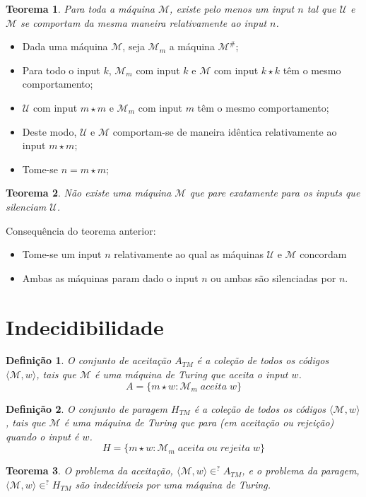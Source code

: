 \documentclass[10pt,a4paper]{report}
\newtheorem{definition}{Definição}
\newtheorem{theorem}{Teorema}
\begin{document}
\begin{theorem}
Para toda a máquina $\mathcal{M}$, existe pelo menos um input $n$ tal que $\mathcal{U}$ e $\mathcal{M}$ se comportam da mesma maneira relativamente ao input $n$.
\end{theorem}
\begin{itemize}
\item Dada uma máquina $\mathcal{M}$, seja $\mathcal{M}_m$ a máquina $\mathcal{M}^\#$;
\item Para todo o input $k$, $\mathcal{M}_m$ com input $k$ e $\mathcal{M}$ com input $k\star k$ têm o mesmo comportamento;
\item $\mathcal{U}$ com input $m\star m$ e $\mathcal{M}_m$ com input $m$ têm o mesmo comportamento;
\item Deste modo, $\mathcal{U}$ e $\mathcal{M}$ comportam-se de maneira idêntica relativamente
ao input $m\star m$;
\item Tome-se $n = m\star m$;
\end{itemize}
\begin{theorem}
Não existe uma máquina $\mathcal{M}$ que pare exatamente para os inputs que silenciam $\mathcal{U}$.
\end{theorem}
Consequência do teorema anterior:
\begin{itemize}
\item Tome-se um input $n$ relativamente ao qual as máquinas $\mathcal{U}$ e $\mathcal{M}$ concordam
\item Ambas as máquinas param dado o input $n$ ou ambas são silenciadas por $n$.
\end{itemize}

\section{Indecidibilidade}
\begin{definition}
O conjunto de aceitação $A_{TM}$ é a coleção de todos os códigos $\langle \mathcal{M}, w \rangle$, tais que $\mathcal{M}$ é uma máquina de Turing que aceita o input $w$.
$$
A = \{ m \star w : \mathcal{M}_m \; aceita \; w\}
$$
\end{definition}
\begin{definition}
O conjunto de paragem $H_{TM}$ é a coleção de todos os códigos $\langle \mathcal{M}, w\rangle$, tais que $\mathcal{M}$ é uma máquina de Turing que para (em aceitação ou rejeição) quando o input é $w$.
$$
H = \{ m \star w: \mathcal{M}_m \; aceita \; ou \; rejeita \; w\}
$$
\end{definition}
\begin{theorem}
O problema da aceitação, $\langle \mathcal{M}, w\rangle \in^? A_{TM}$, e o problema da paragem, $\langle \mathcal{M}, w\rangle \in^? H_{TM}$ são indecidíveis por uma máquina de Turing.
\end{theorem}
\end{document}
